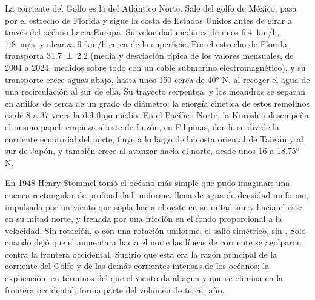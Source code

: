 La corriente del Golfo es la  del Atlántico Norte. Sale del golfo de México, pasa por el estrecho de Florida y sigue la costa de Estados Unidos antes de girar a través del océano hacia Europa. Su velocidad media es de unos \qty{6.4}{km/h}, \qty{1.8}{m/s}, y alcanza \qty{9}{km/h} cerca de la superficie. Por el estrecho de Florida transporta \qty[uncertainty-mode=separate]{31.7 \pm 2.2}{\sverdrup} (media y desviación típica de los valores mensuales, de 2004 a 2024, medidos sobre todo con un cable submarino electromagnético), y su transporte crece aguas abajo, hasta unos \qty{150}{\sverdrup} cerca de \ang{40} N, al recoger el agua de una recirculación al sur de ella. Su trayecto serpentea, y los meandros se separan en anillos de cerca de un grado de diámetro; la energía cinética de estos remolinos es de 8 a 37 veces la del flujo medio. En el Pacífico Norte, la Kuroshio desempeña el mismo papel: empieza al este de Luzón, en Filipinas, donde se divide la corriente ecuatorial del norte, fluye a lo largo de la costa oriental de Taiwán y al sur de Japón, y también crece al avanzar hacia el norte, desde unos \qty{16}{\sverdrup} a \ang{18.75} N.

\begin{history}[Stommel 1948]
En 1948 Henry Stommel tomó el océano más simple que pudo imaginar: una cuenca rectangular de profundidad uniforme, llena de agua de densidad uniforme, impulsada por un viento que sopla hacia el oeste en su mitad sur y hacia el este en su mitad norte, y frenada por una fricción en el fondo proporcional a la velocidad. Sin rotación, o con una rotación uniforme, el  salió simétrico, sin . Solo cuando dejó que el  aumentara hacia el norte las líneas de corriente se agolparon contra la frontera occidental. Sugirió que esta era la razón principal de la corriente del Golfo y de las demás corrientes intensas de los océanos; la explicación, en términos del  que el viento da al agua y que se elimina en la frontera occidental, forma parte del volumen de tercer año.
\end{history}

